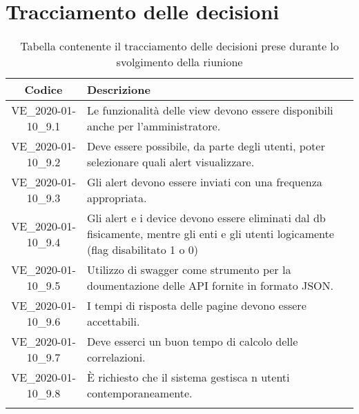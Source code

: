 \section*{Tracciamento delle decisioni}

\begin{center}
	\begin{longtable}{|c|p{12.25cm}|}
	\hline
	\rowcolor{lighter-grayer}
	\textbf{Codice} & \textbf{Descrizione} \\
	\hline
	\endfirsthead
	
	\hline
	VE\_2020-01-10\_9.1 & Le funzionalità delle view devono essere disponibili anche per l'amministratore. \\
	\hline
	VE\_2020-01-10\_9.2 & Deve essere possibile, da parte degli utenti, poter selezionare quali alert visualizzare. \\
	\hline
	VE\_2020-01-10\_9.3 & Gli alert devono essere inviati con una frequenza appropriata. \\
	\hline
	VE\_2020-01-10\_9.4 & Gli alert e i device devono essere eliminati dal db fisicamente, mentre gli enti e gli utenti logicamente (flag disabilitato 1 o 0) \\
	\hline
	VE\_2020-01-10\_9.5 & Utilizzo di swagger come strumento per la doumentazione delle API fornite in formato JSON. \\
	\hline
	VE\_2020-01-10\_9.6 & I tempi di risposta delle pagine devono essere accettabili. \\
	\hline
	VE\_2020-01-10\_9.7 & Deve esserci un buon tempo di calcolo delle correlazioni. \\
	\hline
	VE\_2020-01-10\_9.8 & È richiesto che il sistema gestisca n utenti contemporaneamente. \\
	\hline
	\caption{Tabella contenente il tracciamento delle decisioni prese durante lo svolgimento della riunione}
	\end{longtable}
\end{center}